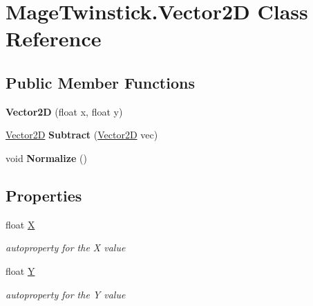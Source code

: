 \hypertarget{class_mage_twinstick_1_1_vector2_d}{}\section{Mage\+Twinstick.\+Vector2\+D Class Reference}
\label{class_mage_twinstick_1_1_vector2_d}
\subsection*{Public Member Functions}
\begin{DoxyCompactItemize}
\item 
\hypertarget{class_mage_twinstick_1_1_vector2_d_a36be1b509d98d7ff48b7fff196a5bf23}{}{\bfseries Vector2\+D} (float x, float y)\label{class_mage_twinstick_1_1_vector2_d_a36be1b509d98d7ff48b7fff196a5bf23}

\item 
\hypertarget{class_mage_twinstick_1_1_vector2_d_a0675eb9cec3cd171d73797698e54f3ba}{}\hyperlink{class_mage_twinstick_1_1_vector2_d}{Vector2\+D} {\bfseries Subtract} (\hyperlink{class_mage_twinstick_1_1_vector2_d}{Vector2\+D} vec)\label{class_mage_twinstick_1_1_vector2_d_a0675eb9cec3cd171d73797698e54f3ba}

\item 
\hypertarget{class_mage_twinstick_1_1_vector2_d_a5b24373bc619c7fc5709bba32ca5303c}{}void {\bfseries Normalize} ()\label{class_mage_twinstick_1_1_vector2_d_a5b24373bc619c7fc5709bba32ca5303c}

\end{DoxyCompactItemize}
\subsection*{Properties}
\begin{DoxyCompactItemize}
\item 
float \hyperlink{class_mage_twinstick_1_1_vector2_d_ac750d49285ebcd4e4bb81295f91ab600}{X}
\begin{DoxyCompactList}\small\item\em autoproperty for the X value \end{DoxyCompactList}\item 
float \hyperlink{class_mage_twinstick_1_1_vector2_d_a0ae54e599156e7c295515bfc80834bfd}{Y}
\begin{DoxyCompactList}\small\item\em autoproperty for the Y value \end{DoxyCompactList}\end{DoxyCompactItemize}


